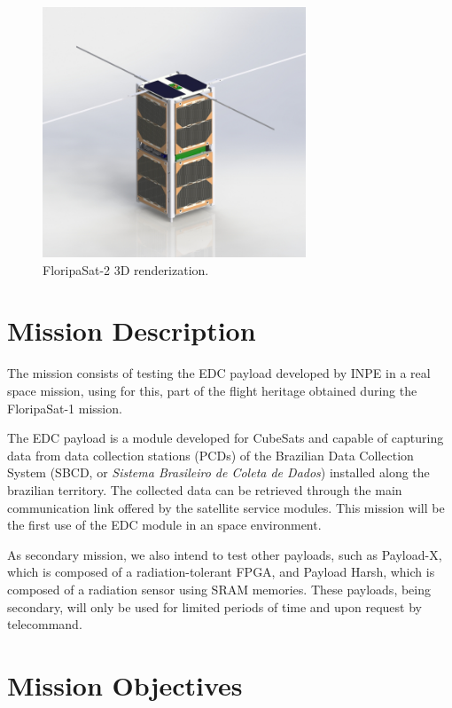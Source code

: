 \begin{figure}[!ht]
    \begin{center}
        \includegraphics[width=0.7\textwidth]{figures/floripasat-2.jpg}
        \caption{FloripaSat-2 3D renderization.}
        \label{fig:floripasat-2-render}
    \end{center}
\end{figure}

\section{Mission Description}

The mission consists of testing the EDC payload developed by INPE in a real space mission, using for this, part of the flight heritage obtained during the FloripaSat-1 mission.

The EDC payload is a module developed for CubeSats and capable of capturing data from data collection stations (PCDs) of the Brazilian Data Collection System (SBCD, or \textit{Sistema Brasileiro de Coleta de Dados}) installed along the brazilian territory. The collected data can be retrieved through the main communication link offered by the satellite service modules. This mission will be the first use of the EDC module in an space environment.

As secondary mission, we also intend to test other payloads, such as Payload-X, which is composed of a radiation-tolerant FPGA, and Payload Harsh, which is composed of a radiation sensor using SRAM memories. These payloads, being secondary, will only be used for limited periods of time and upon request by telecommand.

\section{Mission Objectives}

